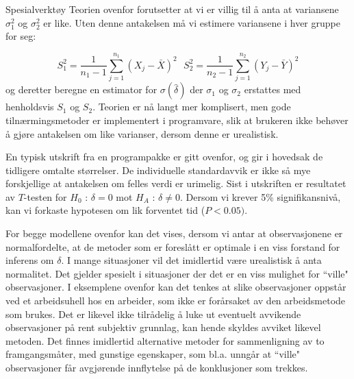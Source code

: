 \begin{eksempel}{Spesialverktøy}
 Teorien ovenfor forutsetter at vi er villig 
til å anta at variansene ${\sigma}_1^2$ og ${\sigma}_2^2$ er like.
Uten denne antakelsen må vi estimere variansene i hver gruppe for seg:

\[  S_1^2=\frac{1}{n_1-1} \sum_{j=1}^{n_1}{(X_j-\bar{X})}^2 \mbox{\ \ \ \ \ }
    S_2^2=\frac{1}{n_2-1} \sum_{j=1}^{n_2}{(Y_j-\bar{Y})}^2 \]
og deretter beregne en estimator for $\sigma(\hat{\delta})$ der
${\sigma}_1$ og ${\sigma}_2$ erstattes med henholdsvis $S_1$ og $S_2$.
Teorien er nå langt mer komplisert, men gode tilnærmingsmetoder
er implementert i programvare, slik at brukeren ikke behøver å
gjøre antakelsen om like varianser, dersom denne er urealistisk.


\begin{center}  \end{center} 
En typisk utskrift fra en programpakke er gitt ovenfor, og gir
i hovedsak  de tidligere omtalte størrelser.
De individuelle standardavvik er ikke så mye forskjellige at
antakelsen om felles verdi er urimelig. Sist i utskriften er resultatet
av $T$-testen for $H_0$ : $\delta =0$ mot $H_A$ : $\delta \neq 0$.
Dersom vi krever 5\% signifikansnivå, kan vi forkaste hypotesen om
lik forventet tid ($P < 0.05)$.
\end{eksempel}
For begge modellene ovenfor kan det vises, dersom vi antar at
observasjonene er normalfordelte, at de metoder som er
foreslått er optimale i en viss forstand for inferens om
${\delta}$.  I mange situa\-sjo\-ner vil det imidlertid være urealistisk
å anta normalitet.  Det gjelder spesielt i situasjoner der det er 
en viss mulighet for ``ville" observasjoner.  I eksemplene ovenfor kan det
tenkes at slike observasjoner oppstår ved et arbeidsuhell hos en
arbeider, som ikke er forårsaket av den arbeidsmetode som brukes.  
Det er likevel ikke tilrådelig å luke ut eventuelt avvikende 
observasjoner på rent subjektiv grunnlag, kan hende skyldes avviket
likevel metoden.  Det finnes imidlertid alternative metoder for
sammenligning av to framgangsmåter, med gunstige egenskaper, som
bl.a. unngår at ``ville" observasjoner får avgjørende
innflytelse på de konklusjoner som trekkes.

